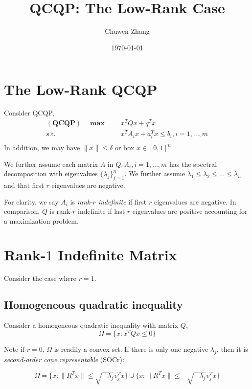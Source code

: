 \documentclass[a4paper, 10pt]{article}
\title{QCQP: The Low-Rank Case}
\author{Chuwen Zhang}
\date{\today}
\newcommand{\model}[1]{(\textbf{#1})}
\newcommand{\mx}{\mathbf{\max}\;}
\begin{document}
\maketitle
\section{The Low-Rank QCQP}

Consider QCQP,
\begin{equation}
    \label{eq:inhoqcqp}
    \begin{aligned}
        \model{QCQP} \quad \mx \quad & x^T Qx + q^T x                           \\
        \textrm{s.t.} \quad          & x^T A_i x + a_i^T x \le b_i, i=1, ..., m \\
    \end{aligned}
\end{equation}
In addition, we may have \(\|x\| \le \delta\) or box \(x \in [0, 1]^n\).

We further assume each matrix \(A\) in \(Q, A_i, i=1,...,m\) has the spectral decomposition with eigenvalues \(\{\lambda_j\}_{j=1}^n\). We further assume \(\lambda_1 \le \lambda_2 \le ... \le \lambda_n\) and that first \(r\) eigenvalues are negative.

For clarity, we say \(A_i\) is \emph{rank-\(r\) indefinite} if first \(r\) eigenvalues are negative. In comparison, \(Q\) is rank-\(r\) indefinite if last \(r\) eigenvalues are positive accounting for a maximization problem.

\section{Rank-\(1\) Indefinite Matrix}

Consider the case where \(r=1\).
\subsection{Homogeneous quadratic inequality}
Consider a homogeneous quadratic inequality with matrix \(Q\),
\begin{equation}
    \Omega = \{x: x^TQx \le 0\}
\end{equation}


Note if \(r = 0\), \( \Omega\) is readily a convex set. If there is only one negative \(\lambda_j\), then it is \emph{second-order cone representable} (SOCr):

\begin{equation}
    \Omega = \{x: \|R^Tx\| \le \sqrt {-\lambda_j} v_j^Tx \} \cup \{x: \|R^Tx\| \le - \sqrt {-\lambda_j} v_j^Tx \}
\end{equation}
\end{document}
